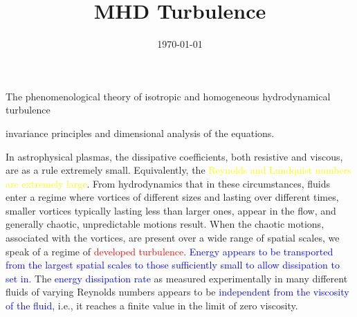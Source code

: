 \documentclass[12pt,a4paper]{article}
\title{MHD Turbulence}
\author{}
\date{\today}
\begin{document}
\maketitle
\cite{2015bps..book.....C} The phenomenological theory of isotropic and homogeneous hydrodynamical turbulence

invariance principles and dimensional analysis of the equations.

In astrophysical plasmas, the dissipative coefficients, both resistive and viscous, are as a rule extremely small. Equivalently, the \textcolor{yellow}{Reynolds and Lundquist numbers are extremely large}. From hydrodynamics that in these circumstances, fluids enter a regime where vortices of different sizes and lasting over different times, smaller vortices typically lasting less than larger ones, appear in the flow, and generally chaotic, unpredictable motions result. When the chaotic motions, associated with the vortices, are present over a wide range of spatial scales, we speak of a regime of \textcolor{red}{developed turbulence}. \textcolor{blue}{Energy appears to be transported from the largest spatial scales to those sufficiently small to allow dissipation to set in}. The \textcolor{blue}{energy dissipation rate} as measured experimentally in many different fluids of varying Reynolds numbers appears to be \textcolor{blue}{independent from the viscosity of the fluid}, i.e., it reaches a finite value in the limit of zero viscosity.
\end{document}
